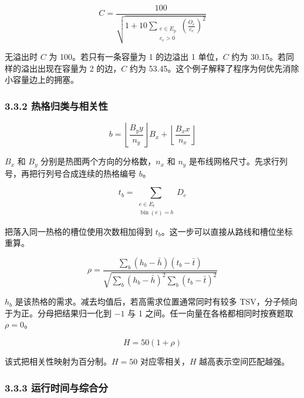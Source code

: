 \documentclass[12pt,a4paper]{article}
\begin{document}
\begin{equation}
C=\frac{100}{\sqrt{1+10\displaystyle\sum_{\substack{e\in E_{\mathrm p}\\c_e>0}}\left(\frac{O_e}{c_e}\right)^2}}
\label{eq:congestion}
\end{equation}

无溢出时 \(C\) 为 100。若只有一条容量为 1 的边溢出 1 单位，\(C\) 约为
30.15。若同样的溢出出现在容量为 2 的边，\(C\) 约为
53.45。这个例子解释了程序为何优先消除小容量边上的拥塞。

\subsubsection{3.3.2
热格归类与相关性}\label{ux70edux683cux5f52ux7c7bux4e0eux76f8ux5173ux6027}

\begin{equation}
b=\left\lfloor\frac{B_y y}{n_y}\right\rfloor B_x+\left\lfloor\frac{B_x x}{n_x}\right\rfloor
\label{eq:bin}
\end{equation}

\(B_x\) 和 \(B_y\) 分别是热图两个方向的分格数，\(n_x\) 和 \(n_y\)
是布线网格尺寸。先求行列号，再把行列号合成连续的热格编号 \(b\)。

\begin{equation}
t_b=\sum_{\substack{e\in E_{\mathrm t}\\\operatorname{bin}(e)=b}}D_e
\label{eq:counts}
\end{equation}

把落入同一热格的槽位使用次数相加得到
\(t_b\)。这一步可以直接从路线和槽位坐标重算。

\begin{equation}
\rho=\frac{\sum_b(h_b-\bar h)(t_b-\bar t)}{\sqrt{\sum_b(h_b-\bar h)^2\sum_b(t_b-\bar t)^2}}
\label{eq:pearson}
\end{equation}

\(h_b\) 是该热格的需求。减去均值后，若高需求位置通常同时有较多
TSV，分子倾向于为正。分母把结果归一化到 \(-1\) 与 1
之间。任一向量在各格都相同时按赛题取 \(\rho=0\)。

\begin{equation}
H=50(1+\rho)
\label{eq:heat}
\end{equation}

该式把相关性映射为百分制。\(H=50\) 对应零相关，\(H\) 越高表示空间匹配越强。

\subsubsection{3.3.3
运行时间与综合分}\label{ux8fd0ux884cux65f6ux95f4ux4e0eux7efcux5408ux5206}
\end{document}
